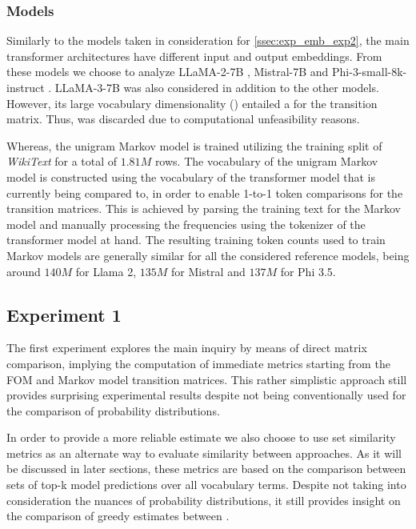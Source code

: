 \subsubsection{Models}

Similarly to the models taken in consideration for \cref{ssec:exp_emb_exp2}, the main  transformer architectures have different input and output embeddings.
From these models we choose to analyze LLaMA-2-7B , Mistral-7B  and Phi-3-small-8k-instruct .
LLaMA-3-7B  was also considered in addition to the other models.
However, its large vocabulary dimensionality () entailed a  for the transition matrix.
Thus,  was discarded due to computational unfeasibility reasons.

Whereas, the unigram Markov model is trained utilizing the training split of \emph{WikiText} for a total of $1.81M$ rows.
The vocabulary of the unigram Markov model is constructed using the vocabulary of the transformer model that is currently being compared to, in order to enable 1-to-1 token comparisons for the transition matrices.
This is achieved by parsing the training text for the Markov model and manually processing the frequencies using the tokenizer of the transformer model at hand.
The resulting training token counts used to train Markov models are generally similar for all the considered reference models, being around $140M$ for Llama 2, $135M$ for Mistral and $137M$ for Phi 3.5.

\subsection{Experiment 1}

The first experiment explores the main inquiry by means of direct matrix comparison, implying the computation of immediate metrics starting from the FOM and Markov model transition matrices.
This rather simplistic approach still provides surprising experimental results despite not being conventionally used for the comparison of probability distributions.

In order to provide a more reliable estimate we also choose to use set similarity metrics as an alternate way to evaluate similarity between approaches.
As it will be discussed  in later sections, these metrics are based on the comparison between sets of top-k model predictions over all vocabulary terms.
Despite  not taking into consideration the nuances of probability distributions, it still provides insight on the comparison of greedy estimates between .

